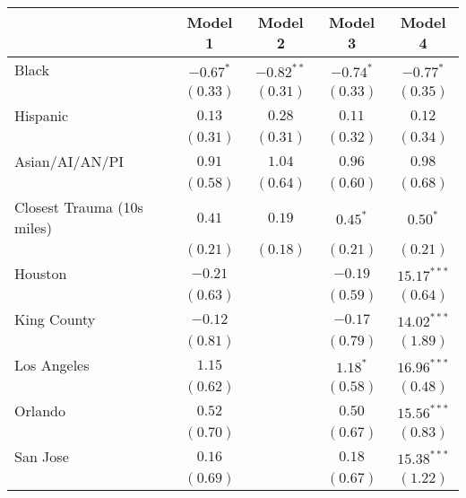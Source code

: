 
\begin{table}[ht!]
\begin{center}
\begin{tabular}{l c c c c}
\toprule
 & Model 1 & Model 2 & Model 3 & Model 4 \\
\midrule
Black                      & $-0.67^{*}$ & $-0.82^{**}$ & $-0.74^{*}$ & $-0.77^{*}$    \\
                           & $(0.33)$    & $(0.31)$     & $(0.33)$    & $(0.35)$       \\
Hispanic                   & $0.13$      & $0.28$       & $0.11$      & $0.12$         \\
                           & $(0.31)$    & $(0.31)$     & $(0.32)$    & $(0.34)$       \\
Asian/AI/AN/PI             & $0.91$      & $1.04$       & $0.96$      & $0.98$         \\
                           & $(0.58)$    & $(0.64)$     & $(0.60)$    & $(0.68)$       \\
Closest Trauma (10s miles) & $0.41$      & $0.19$       & $0.45^{*}$  & $0.50^{*}$     \\
                           & $(0.21)$    & $(0.18)$     & $(0.21)$    & $(0.21)$       \\
Houston                    & $-0.21$     &              & $-0.19$     & $15.17^{***}$  \\
                           & $(0.63)$    &              & $(0.59)$    & $(0.64)$       \\
King County                & $-0.12$     &              & $-0.17$     & $14.02^{***}$  \\
                           & $(0.81)$    &              & $(0.79)$    & $(1.89)$       \\
Los Angeles                & $1.15$      &              & $1.18^{*}$  & $16.96^{***}$  \\
                           & $(0.62)$    &              & $(0.58)$    & $(0.48)$       \\
Orlando                    & $0.52$      &              & $0.50$      & $15.56^{***}$  \\
                           & $(0.70)$    &              & $(0.67)$    & $(0.83)$       \\
San Jose                   & $0.16$      &              & $0.18$      & $15.38^{***}$  \\
                           & $(0.69)$    &              & $(0.67)$    & $(1.22)$       \\

\end{tabular}
\end{center}
\end{table}
